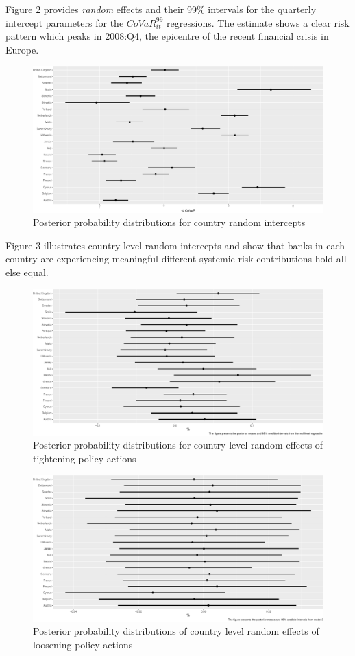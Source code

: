 \documentclass[
  10pt,
]{article}
\begin{document}
Figure 2 provides \emph{random} effects and their 99\% intervals for the
quarterly intercept parameters for the \(CoVaR^{99}_{it}\) regressions.
The estimate shows a clear risk pattern which peaks in 2008:Q4, the
epicentre of the recent financial crisis in Europe.

\begin{figure}[H]
\includegraphics{figures/paper-fig4-1} \caption{Posterior probability distributions for country random intercepts}\label{fig:fig4}
\end{figure}

Figure 3 illustrates country-level random intercepts and show that banks
in each country are experiencing meaningful different systemic risk
contributions hold all else equal.

\begin{figure}[H]
\includegraphics{figures/paper-fig5-1} \caption{Posterior probability distributions for country level random effects of tightening policy actions}\label{fig:fig5}
\end{figure}

\begin{figure}[H]
\includegraphics{figures/paper-fig6-1} \caption{Posterior probability distributions of country level random effects of loosening policy actions}\label{fig:fig6}
\end{figure}
\end{document}
